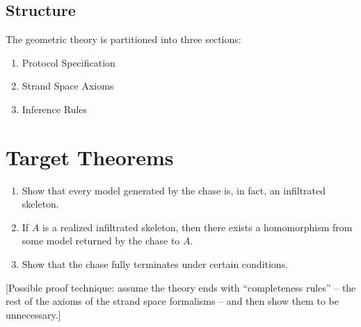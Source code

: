 \documentclass[12pt]{article}
\begin{document}
\subsection{Structure}
The geometric theory is partitioned into three sections:

\begin{enumerate}
\item Protocol Specification
\item Strand Space Axioms
\item Inference Rules
\end{enumerate}

\section{Target Theorems}

\begin{enumerate}
\item
Show that every model generated by the chase is, in fact, an
infiltrated skeleton.
\item
If $A$ is a realized infiltrated skeleton, then there exists a
homomorphism from some model returned by the chase to $A$.
\item
Show that the chase fully terminates under certain conditions.
\end{enumerate}

[Possible proof technique: assume the theory ends with ``completeness
  rules'' -- the rest of the axioms of the strand space formalisms --
  and then show them to be unnecessary.]
\end{document}
